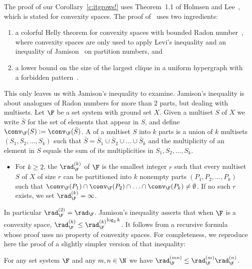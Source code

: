 %
The proof of our Corollary~\ref{c:itgrows!} uses Theorem~1.1 of Holmsen and Lee~\cite{Holmsen2021}, which is stated for convexity spaces. The proof of~\cite[Theorem~1.1]{Holmsen2021} uses two ingredients:
%
\begin{enumerate}
\item a colorful Helly theorem for convexity spaces with bounded Radon number~\cite[Theorem~2.2]{Holmsen2021}, where convexity spaces are only used to apply Levi's inequality and an inequality of Jamison~\cite[Ineq.~(6)]{jamison1981partition} on partition numbers, and\medskip
%
\item a lower bound on the size of the largest clique in a uniform hypergraph with a forbidden pattern~\cite[Theorem~1.2]{Holmsen2020}.
\end{enumerate}
%
\noindent
This only leaves us with Jamison's inequality to examine. Jamison's inequality is about analogues of Radon numbers for more than $2$ parts, but dealing with multisets.
%
\medskip
%
Let $\F$ be a set system with ground set $X$. Given a multiset $S$ of $X$ we write $\bar S$ for the set of elements that appear in $S$, and define $\conv_\F(S) := \conv_\F(\bar S)$. A  of a multiset $S$ into $k$ parts is a union of $k$ multisets $(S_1, S_2, \ldots, S_k)$ such that $\bar S = \bar S_1 \cup \bar S_2 \cup \ldots \cup \bar S_k$ and the multiplicity of an element in $S$ equals the sum of its multiplicities in $S_1, S_2, \ldots, S_k$. 
%
\begin{itemize}
\item For $k \ge 2$, the  $\rad^{(k)}_\F$ of $\F$ is the smallest integer $r$ such that every multiset $S$ of $X$ of size $r$ can be partitioned into $k$ nonempty parts $(P_1, P_2, \ldots, P_k)$ such that $\conv_{\F}(P_1) \cap \conv_{\F}(P_2) \cap \ldots  \cap \conv_{\F}(P_k)\neq \emptyset$. If no such $r$ exists, we set $\rad_\F^{(k)}=\infty$.
\end{itemize}
%
\noindent
In particular $\rad^{(2)}_\F = \rad_\F$. Jamison's inequality asserts that when $\F$ is a convexity space, $\rad^{(k)}_\F \le {\rad^{(k)}_\F}^{\log_2 k}$. It follows from a recursive formula~\cite[Theorem~1]{jamison1981partition} whose proof uses no property of convexity spaces. For completeness, we reproduce here the proof of a slightly simpler version of that inequality:
%
\begin{lemma}
  For any set system $\F$ and any $m,n \in \N$ we have $\rad^{(mn)}_\F \le \rad^{(m)}_\F\rad^{(n)}_\F$.
\end{lemma}
